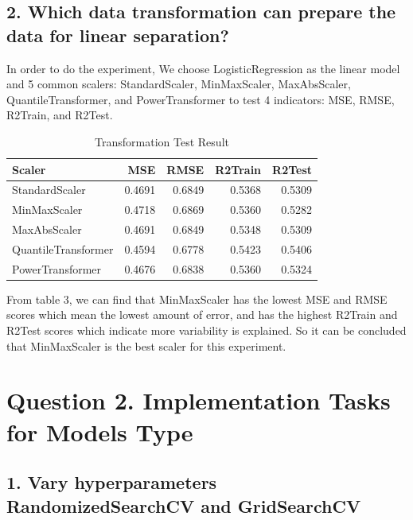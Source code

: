 \documentclass[UTF8]{ctexart}
\begin{document}
\subsection*{2. Which data transformation can prepare the data for linear separation?}

In order to do the experiment,   We choose LogisticRegression as the linear model and 5 common scalers: StandardScaler, MinMaxScaler, MaxAbsScaler, QuantileTransformer, and PowerTransformer to test 4 indicators: MSE, RMSE, R2Train, and R2Test.

\begin{table}[htbp]
	\centering

	\begin{tabular}{lrrrr}
		\toprule
		Scaler              & MSE    & RMSE   & R2Train & R2Test \\
		\midrule
		StandardScaler      & 0.4691 & 0.6849 & 0.5368  & 0.5309 \\
		MinMaxScaler        & 0.4718 & 0.6869 & 0.5360  & 0.5282 \\
		MaxAbsScaler        & 0.4691 & 0.6849 & 0.5348  & 0.5309 \\
		QuantileTransformer & 0.4594 & 0.6778 & 0.5423  & 0.5406 \\
		PowerTransformer    & 0.4676 & 0.6838 & 0.5360  & 0.5324 \\
		\bottomrule
	\end{tabular}

	\setlength{\abovecaptionskip}{0.3cm}
	\setlength{\belowcaptionskip}{0cm}

	\caption{Transformation Test Result}
\end{table}

From table 3, we can find that MinMaxScaler has the lowest MSE and RMSE scores which mean the lowest amount of error, and has the highest R2Train and R2Test scores which indicate more variability is explained. So it can be concluded that MinMaxScaler is the best scaler for this experiment.

\section*{Question 2. Implementation Tasks for Models Type}

\subsection*{1. Vary hyperparameters RandomizedSearchCV and GridSearchCV}
\end{document}
